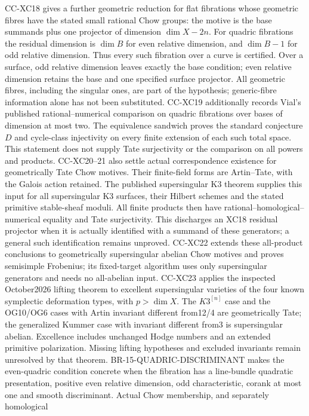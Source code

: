 \begin{description}[style=nextline,leftmargin=0pt]
CC-XC18 gives a further geometric reduction for flat fibrations whose
geometric fibres have the stated small rational Chow groups: the motive
is the base summands plus one projector of dimension $\dim X-2n$.
For quadric fibrations the residual dimension is $\dim B$ for even
relative dimension, and $\dim B-1$ for odd relative dimension.
Thus every such fibration over a curve is certified. Over a surface,
odd relative dimension leaves exactly the base condition; even relative
dimension retains the base and one specified surface projector.
All geometric fibres, including the singular ones, are part of the
hypothesis; generic-fibre information alone has not been substituted.
CC-XC19 additionally records Vial's published rational--numerical
comparison on quadric fibrations over bases of dimension at most two.
The equivalence sandwich proves the standard conjecture $D$ and
cycle-class injectivity on every finite extension of each such total
space. This statement does not supply Tate surjectivity or the
comparison on all powers and products.
CC-XC20--21 also settle actual correspondence existence for geometrically
Tate Chow motives. Their finite-field forms are Artin--Tate, with the
Galois action retained. The published supersingular K3 theorem supplies
this input for all supersingular K3 surfaces, their Hilbert schemes and
the stated primitive stable-sheaf moduli. All finite products then have
rational--homological--numerical equality and Tate surjectivity.
This discharges an XC18 residual projector when it is actually identified
with a summand of these generators; a general such identification remains
unproved.
CC-XC22 extends these all-product conclusions to geometrically supersingular
abelian Chow motives and proves semisimple Frobenius; its fixed-target
algorithm uses only supersingular generators and needs no all-abelian input.
CC-XC23 applies the inspected October2026 lifting theorem to excellent
supersingular varieties of the four known symplectic deformation types,
with $p>\dim X$. The $K3^{[n]}$ case and the OG10/OG6 cases with Artin
invariant different from12/4 are geometrically Tate; the generalized
Kummer case with invariant different from3 is supersingular abelian.
Excellence includes unchanged Hodge numbers and an extended primitive
polarization. Missing lifting hypotheses and excluded invariants remain
unresolved by that theorem.
BR-15-QUADRIC-DISCRIMINANT makes the even-quadric condition concrete
when the fibration has a line-bundle quadratic presentation, positive
even relative dimension, odd characteristic, corank at most one and
smooth discriminant. Actual Chow membership, and separately homological

\end{description}

